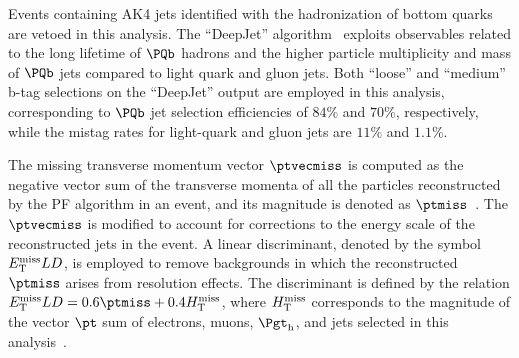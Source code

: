 Events containing AK4 jets identified with the hadronization of bottom quarks are vetoed in this analysis.
The ``DeepJet'' algorithm~\cite{CMS-DP-2017-013}
exploits observables related to the long lifetime of $\Pbottom$ hadrons
and the higher particle multiplicity and mass of $\Pbottom$ jets compared to light quark and gluon jets.
Both ``loose'' and ``medium'' b-tag selections on the ``DeepJet'' output are employed in this analysis,
corresponding to $\Pbottom$ jet selection efficiencies of $84\%$ and $70\%$, respectively,
while the mistag rates for light-quark and gluon jets are $11\%$ and $1.1\%$.

The missing transverse momentum vector $\ptvecmiss$ is computed as the negative vector sum of the transverse momenta of all the particles reconstructed by the PF algorithm in an event, 
and its magnitude is denoted as $\ptmiss$~\cite{Sirunyan:2019kia}. 
The $\ptvecmiss$ is modified to account for corrections to the energy scale of the reconstructed jets in the event. 
A linear discriminant, denoted by the symbol $E_{\mathrm{T}}^\text{miss} LD$,
is employed to remove backgrounds in which the reconstructed $\ptmiss$ arises from resolution effects.
The discriminant is defined by the relation $\metLD = 0.6 \ptmiss + 0.4 \metHT$,
where $H_{\mathrm{T}}^\text{miss}$ corresponds to the magnitude of the vector $\pt$ sum of electrons, muons, $\tauh$, and jets selected in this analysis~\cite{Sirunyan:2018shy}.
